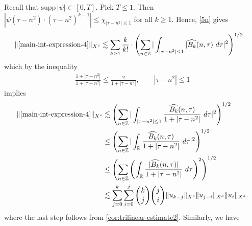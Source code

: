 \documentclass[12pt,reqno]{amsart}
\numberwithin{equation}{section}  %
\numberwithin{figure}{section}
\newcommand{\rr}{\mathbb{R}}
\newcommand{\zz}{\mathbb{Z}}
\newcommand{\wh}{\widehat}
\theoremstyle{plain}
\theoremstyle{definition}
\theoremstyle{remark}
\begin{document}
%
Recall that $\text{supp} \, |\psi| \subset [0, T ]$. Pick $T \le 1$. 
Then $| \psi\left( \tau - n^{2} \right) \cdot \left( \tau - n^{2} \right)^{k 
-1} | \le \chi_{| \tau - n^{2} | \le 1}$ for all $k \ge 1$. Hence, \eqref{5n} gives
%
\begin{equation*}
  \begin{split}
    \|\eqref{main-int-expression-4} \|_{X^s} 
    & \lesssim \sum_{k \ge 1} \frac{k}{k!} \cdot \left( \sum_{n \in \zz} | 
    \int_{| \tau - n^{2}  |\le 1} | \wh{{B_k}}(n, \tau) \ d \tau |^2 
    \right)^{1/2}
  \end{split}
\end{equation*}
%
which by the inequality
%
\begin{equation*}
  \begin{split}
    \frac{1 + | \tau - n^{2} |}{1 + | \tau  - n^{2} |} \le 
    \frac{2}{1 + | \tau - n^{2} |}, \qquad | \tau - n^{2}  | \le 1
  \end{split}
\end{equation*}
%
implies
%
\begin{equation}
\label{main-int4-est-X-s-part}
  \begin{split}
    \|\eqref{main-int-expression-4}\|_{X^s}
    & \lesssim \left( \sum_{n \in \zz} | \int_{| \tau - n^{2}| \le 1 }
    \frac{\wh{{B_k}}(n, \tau)}{1 + | \tau - n^{2} |} \ d \tau |^2 
    \right)^{1/2}
    \\
    & \le \left( \sum_{n \in \zz} | \int_\rr
    \frac{\wh{{B_k}}(n, \tau)}{1 + | \tau - n^{2} |} \ d \tau |^2 
    \right)^{1/2} \\
    & \le \left( \sum_{n \in \zz} \left( \int_\rr 
    \frac{|\wh{{B_k}}(n, \tau)|}{1 + | \tau - n^{2} |}  \ d \tau  \right)^2
    \right)^{1/2} \\
    & \lesssim 
    \sum_{j=0}^{k} \sum_{i=0}^{j} {k \choose j}{j \choose i}
    \|u_{k-j}\|_{X^s} \| u_{j-i}\|_{X^s}
    \| u_i \|_{X^s}.
  \end{split}
\end{equation}
%
where the last step follows from \autoref{cor:trilinear-estimate2}. Similarly,
we have
%
%
\end{document}
